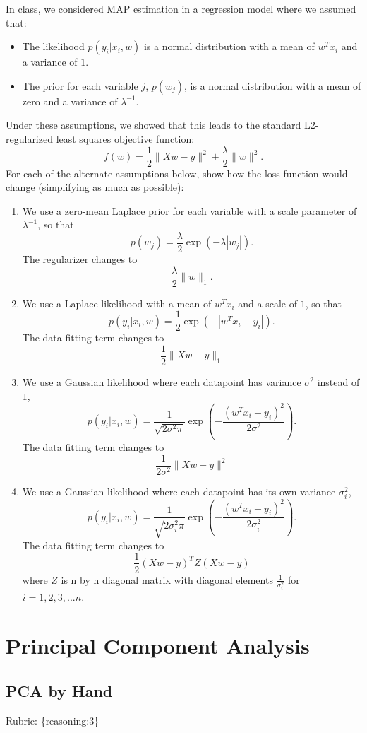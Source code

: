 \documentclass{article}
\def\rubric#1{\gre{Rubric: \{#1\}}}{}
\def\blu#1{{\color{blu}#1}}
\def\gre#1{{\color{gre}#1}}
\def\norm#1{\|#1\|}
\def\items#1{\begin{itemize}#1\end{itemize}}
\def\enum#1{\begin{enumerate}#1\end{enumerate}}
\begin{document}
In class, we considered MAP estimation in a regression model where we assumed that:
\items{
\item The likelihood $p(y_i | x_i, w)$ is a normal distribution with a mean of $w^Tx_i$ and a variance of $1$.
\item The prior for each variable $j$, $p(w_j)$, is a normal distribution with a mean of zero and a variance of $\lambda^{-1}$.
}
Under these assumptions, we showed that this leads to the standard L2-regularized least squares objective function:
\[
f(w) = \frac{1}{2}\norm{Xw - y}^2 + \frac \lambda 2 \norm{w}^2.
\]
\blu{For each of the alternate assumptions below, show how the loss function would change} (simplifying as much as possible):
\enum{
\item We use a zero-mean Laplace prior for each variable with a scale parameter of $\lambda^{-1}$, so that
\[
p(w_j) = \frac{\lambda}{2}\exp(-\lambda|w_j|).
\]
\gre{The regularizer changes to \[
\frac \lambda 2 \norm{w}_1.
\]}
\item We use a Laplace likelihood with a mean of $w^Tx_i$ and a scale of $1$, so that
\[
p(y_i | x_i, w) = \frac 1 2 \exp(-|w^Tx_i - y_i|).
\]
\gre{The data fitting term changes to \[
	\frac{1}{2}\norm{Xw - y}_1
	\]}
\item We use a Gaussian likelihood where each datapoint has variance $\sigma^2$ instead of $1$,
\[
p(y_i | x_i,w) = \frac{1}{\sqrt{2\sigma^2\pi}}\exp\left(-\frac{(w^Tx_i - y_i)^2}{2\sigma^2}\right).
\]
\gre{The data fitting term changes to \[
	\frac{1}{2\sigma^2}\norm{Xw - y}^2
	\]}
\item We use a Gaussian likelihood where each datapoint has its own variance $\sigma_i^2$,
\[
p(y_i | x_i,w) = \frac{1}{\sqrt{2\sigma_i^2\pi}}\exp\left(-\frac{(w^Tx_i - y_i)^2}{2\sigma_i^2}\right).
\]
\gre{The data fitting term changes to \[
	\frac{1}{2}(Xw-y)^TZ(Xw-y)
	\] where $Z$ is n by n diagonal matrix with diagonal elements $\frac{1}{\sigma_i^2}$ for $i=1,2,3, ... n$.}
}









\section{Principal Component Analysis}

\subsection{PCA by Hand}
\rubric{reasoning:3}
\end{document}
